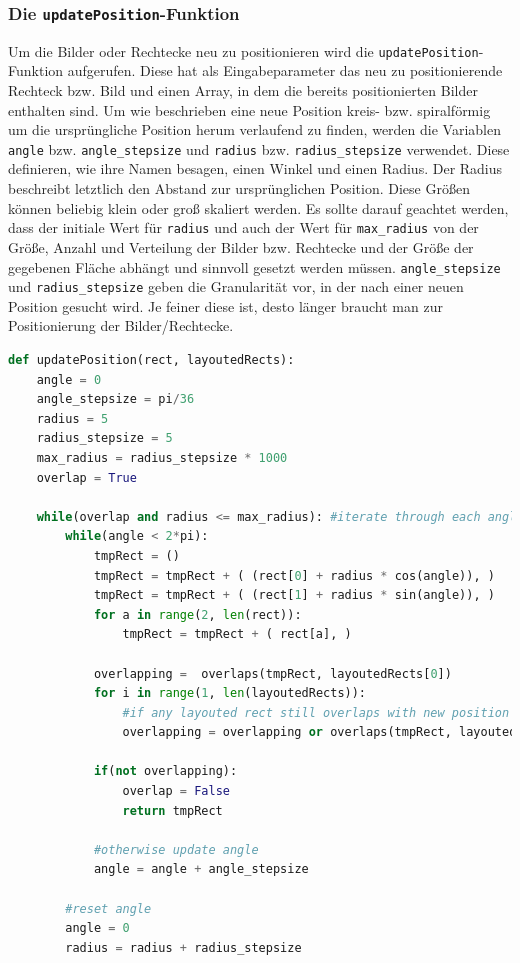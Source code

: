 \documentclass[12pt, ngerman, utf8]{article}
\begin{document}
\subsubsection{Die \texttt{updatePosition}-Funktion}
Um die Bilder oder Rechtecke neu zu positionieren wird die \texttt{updatePosition}-Funktion aufgerufen. Diese hat als Eingabeparameter das neu zu positionierende Rechteck bzw. Bild und einen Array, in dem die bereits positionierten Bilder enthalten sind. Um wie beschrieben eine neue Position kreis- bzw. spiralförmig um die ursprüngliche Position herum verlaufend zu finden, werden die Variablen \texttt{angle} bzw. \texttt{angle\_stepsize} und \texttt{radius} bzw. \texttt{radius\_stepsize} verwendet. Diese definieren, wie ihre Namen besagen, einen Winkel und einen Radius. Der Radius beschreibt letztlich den Abstand zur ursprünglichen Position. Diese Größen können beliebig klein oder groß skaliert werden. Es sollte darauf geachtet werden, dass der initiale Wert für \texttt{radius} und auch der Wert für \texttt{max\_radius} von der Größe, Anzahl und Verteilung der Bilder bzw. Rechtecke und der Größe der gegebenen Fläche abhängt und sinnvoll gesetzt werden müssen. \texttt{angle\_stepsize} und \texttt{radius\_stepsize} geben die Granularität vor, in der nach einer neuen Position gesucht wird. Je feiner diese ist, desto länger braucht man zur Positionierung der Bilder/Rechtecke.\\
\begin{lstlisting}[language=Python, caption={\texttt{updatePosition}-Funktion zur Positionierung der Rechtecke für \emph{RWordle}},label=rot1]
def updatePosition(rect, layoutedRects):
    angle = 0
    angle_stepsize = pi/36
    radius = 5
    radius_stepsize = 5
    max_radius = radius_stepsize * 1000
    overlap = True
    
    while(overlap and radius <= max_radius): #iterate through each angle for radius increased by radius_stepsize until max_radius
        while(angle < 2*pi):
            tmpRect = ()
            tmpRect = tmpRect + ( (rect[0] + radius * cos(angle)), )
            tmpRect = tmpRect + ( (rect[1] + radius * sin(angle)), )
            for a in range(2, len(rect)):
                tmpRect = tmpRect + ( rect[a], )
            
            overlapping =  overlaps(tmpRect, layoutedRects[0])
            for i in range(1, len(layoutedRects)):
                #if any layouted rect still overlaps with new position of tmpRect
                overlapping = overlapping or overlaps(tmpRect, layoutedRects[i])
            
            if(not overlapping):
                overlap = False
                return tmpRect
            
            #otherwise update angle
            angle = angle + angle_stepsize
            
        #reset angle
        angle = 0
        radius = radius + radius_stepsize
\end{lstlisting}
\end{document}
